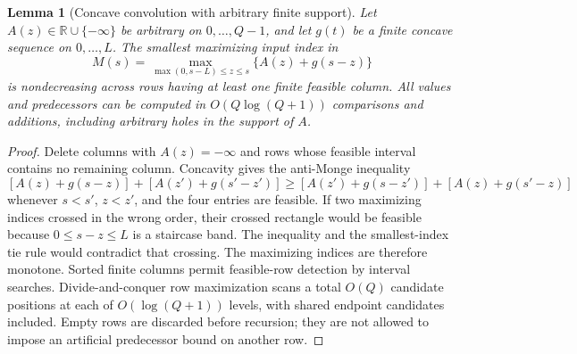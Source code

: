 \documentclass[11pt,letterpaper]{article}
\newtheorem{lemma}[theorem]{Lemma}
\theoremstyle{definition}\newtheorem{remark}[theorem]{Remark}
\begin{document}
\begin{lemma}[Concave convolution with arbitrary finite support]\label{lem:holes56}
Let $A(z)\in\mathbb R\cup\{-\infty\}$ be arbitrary on $0,\ldots,Q-1$, and let $g(t)$ be a finite concave sequence on $0,\ldots,L$. The smallest maximizing input index in
\[
 M(s)=\max_{\max(0,s-L)\leq z\leq s}\{A(z)+g(s-z)\}
\]
is nondecreasing across rows having at least one finite feasible column. All values and predecessors can be computed in $O(Q\log(Q+1))$ comparisons and additions, including arbitrary holes in the support of $A$.
\end{lemma}
\begin{proof}
Delete columns with $A(z)=-\infty$ and rows whose feasible interval contains no remaining column. Concavity gives the anti-Monge inequality
\[
 [A(z)+g(s-z)]+[A(z')+g(s'-z')]
 \geq[A(z')+g(s-z')]+[A(z)+g(s'-z)]
\]
whenever $s<s'$, $z<z'$, and the four entries are feasible. If two maximizing indices crossed in the wrong order, their crossed rectangle would be feasible because $0\leq s-z\leq L$ is a staircase band. The inequality and the smallest-index tie rule would contradict that crossing. The maximizing indices are therefore monotone. Sorted finite columns permit feasible-row detection by interval searches. Divide-and-conquer row maximization scans a total $O(Q)$ candidate positions at each of $O(\log(Q+1))$ levels, with shared endpoint candidates included. Empty rows are discarded before recursion; they are not allowed to impose an artificial predecessor bound on another row.
\end{proof}
\end{document}
